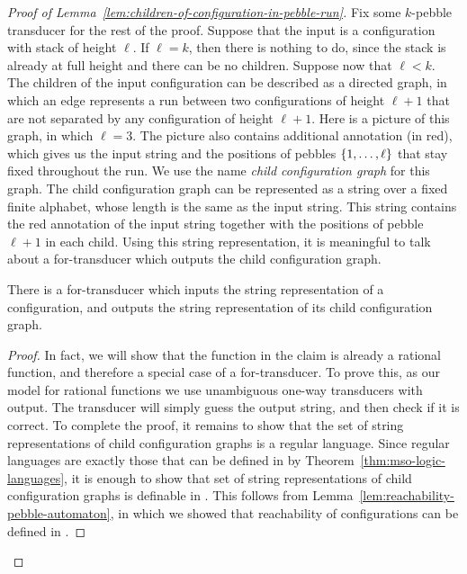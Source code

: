 \begin{proof}[Proof of Lemma~\ref{lem:children-of-configuration-in-pebble-run}] Fix some $k$-pebble transducer for the rest of the proof.   Suppose that the input is a configuration with stack of height $\ell$. If $\ell =k$, then there is nothing to do, since the stack is already at full height and there can be no children. Suppose now that $\ell < k$. The children of the input configuration can be  described as a directed graph, in which an edge represents a run between two configurations of height $\ell+1$ that are not separated by any configuration of height $\ell +1$. Here is a picture of this graph, in which $\ell=3$.
The picture also contains additional annotation (in red), which gives us the input string and the positions of pebbles $\{1,\ldots,\ell\}$ that stay fixed throughout the run. We use the name \emph{child configuration graph} for this graph. The child configuration graph can be represented as a string over a fixed finite alphabet, whose length is the same as the input string.  This string contains the red annotation of the input string together with the positions of pebble $\ell+1$ in each child. Using this string representation, it is meaningful to talk about a for-transducer which outputs the child configuration graph.

\begin{claim}\label{claim:from-configuration-to-child-configuration-graph}
    There is a for-transducer which inputs the string representation of a configuration, and outputs the  string representation of its child configuration graph. 
\end{claim}

\begin{proof}  In fact, we will show that the function in the claim is already a rational function, and therefore a special case of a for-transducer. To prove this, as our model for rational functions we use unambiguous one-way transducers with output. The transducer will simply guess the output string, and then check if it is correct. To complete the proof, it remains to show that the set of string representations of child configuration graphs is a regular language.
Since regular languages are exactly those that can be defined in \mso by Theorem~\ref{thm:mso-logic-languages}, it is enough to show that set of string representations of child configuration graphs is definable in \mso. This follows from  Lemma~\ref{lem:reachability-pebble-automaton}, in which we showed that  reachability of configurations can be defined in \mso. 
\end{proof}


\end{proof}
